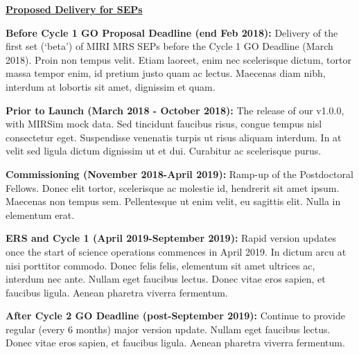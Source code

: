 \medskip
\medskip
\noindent 
{\bf \underline{Proposed Delivery for SEPs}} 

\smallskip
\smallskip
\noindent
{\bf Before Cycle 1 GO Proposal Deadline (end Feb 2018):} 
Delivery of the first set (‘beta’) of MIRI MRS SEPs before the Cycle 1 GO Deadline (March 2018). 
Proin non tempus velit. Etiam laoreet, enim nec scelerisque dictum, tortor massa tempor enim, id pretium justo quam ac lectus. Maecenas diam nibh, interdum at lobortis sit amet, dignissim et quam. 

\smallskip
\smallskip
\noindent
 {\bf Prior to Launch (March 2018 - October 2018):} 
The release of our v1.0.0, with MIRSim mock data. 
Sed tincidunt faucibus risus, congue tempus nisl consectetur eget. Suspendisse venenatis turpis ut risus aliquam interdum. In at velit sed ligula dictum dignissim ut et dui. Curabitur ac scelerisque purus.

\smallskip
\smallskip
\noindent
{\bf Commissioning (November 2018-April 2019):} 
Ramp-up of the Postdoctoral Fellows. 
Donec elit tortor, scelerisque ac molestie id, hendrerit sit amet
ipsum. Maecenas non tempus sem. Pellentesque ut enim velit, eu
sagittis elit. Nulla in elementum erat.

\smallskip
\smallskip
\noindent
{\bf ERS and Cycle 1 (April 2019-September 2019):} 
Rapid version updates once the start of science operations commences
in April 2019.  In dictum arcu at nisi porttitor commodo. Donec felis
felis, elementum sit amet ultrices ac, interdum nec ante. Nullam eget
faucibus lectus. Donec vitae eros sapien, et faucibus ligula. Aenean
pharetra viverra fermentum.

\smallskip
\smallskip
\noindent
{\bf After Cycle 2 GO Deadline (post-September 2019):} 
Continue to provide regular (every 6 months) major version update.
Nullam eget faucibus lectus. Donec vitae eros sapien, et faucibus
ligula. Aenean pharetra viverra fermentum.




